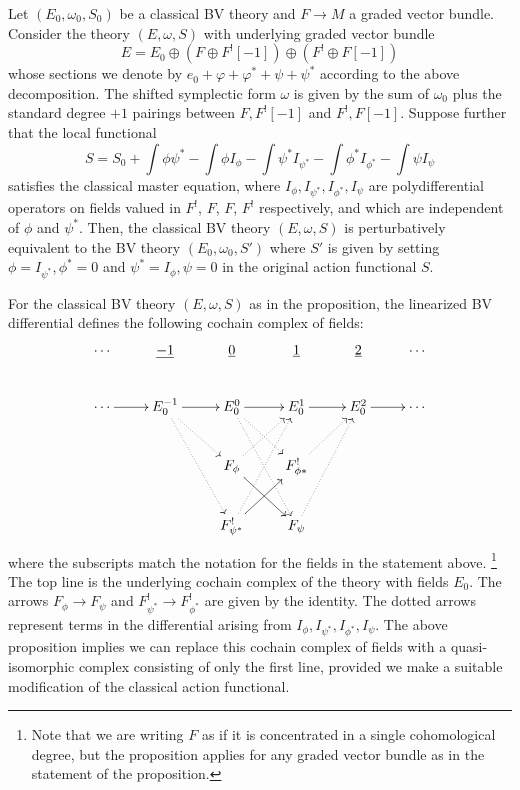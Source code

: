 \documentclass[10pt, oneside]{article}
\begin{document}
\begin{prop} 
\label{prop:BRSTdoublet}
Let $(E_0, \omega_0, S_0)$ be a classical BV theory and $F \to M$ a graded vector bundle.
Consider the theory $(E, \omega, S)$ with underlying graded vector bundle
\[
E = E_0 \oplus \left(F \oplus F^! [-1]\right) \oplus \left(F^! \oplus F[-1] \right)
\]
whose sections we denote by $e_0 + \varphi + \varphi^* + \psi + \psi^*$ according to the above decomposition. 
The shifted symplectic form $\omega$ is given by the sum of $\omega_0$ plus the standard degree $+1$ pairings between $F, F^! [-1]$ and $F^!, F[-1]$. 
Suppose further that the local functional
\[
S = S_0 + \int \phi \psi^* - \int \phi I_\phi - \int \psi^* I_{\psi^*} - \int \phi^* I_{\phi^*} - \int \psi I_{\psi}
\]
satisfies the classical master equation, where $I_{\phi}, I_{\psi^*}, I_{\phi^*}, I_{\psi}$ are polydifferential operators on fields valued in $F^!$, $F$, $F$, $F^!$ respectively, and which are independent of $\phi$ and $\psi^*$.
Then, the classical BV theory $(E, \omega, S)$ is perturbatively equivalent to the BV theory $(E_0, \omega_0, S')$ where $S'$ is given by setting $\phi = I_{\psi^*}, \phi^* = 0$ and $\psi^* = I_{\phi}, \psi = 0$ in the original action functional $S$. 
\end{prop}

\begin{remark}
For the classical BV theory $(E, \omega, S)$ as in the proposition, the linearized BV differential defines the following cochain complex of fields:
\[\xymatrix{
\cdots & \ul{-1} & \ul{0} & \ul{1} & \ul{2} & \cdots \\
\cdots \ar[r] & E_0^{-1}\ar[r] \ar@{.>}[dr] \ar@{.>}[ddr] &E_0^0 \ar@{.>}[ddr] \ar@{.>}[dr]  \ar[r]  &E_0^1 \ar[r] &E_0^2 \ar[r] &\cdots \\
&&F_\phi \ar^{~}[dr]  \ar@{.>}[ur] &F^!_{\phi*}  \ar@{.>}[ur] && \\
&&F^!_{\psi^*} \ar^{~}[ur]  \ar@{.>}[uur]  &F_\psi  \ar@{.>}[uur] && \\
}\]
where the subscripts match the notation for the fields in the statement above. \footnote{Note that we are writing $F$ as if it is concentrated in a single cohomological degree, but the proposition applies for any graded vector bundle as in the statement of the proposition.}
The top line is the underlying cochain complex of the theory with fields $E_0$. 
The arrows $F_\phi \to F_\psi$ and $F^!_{\psi^*} \to F^!_{\phi^*}$ are given by the identity.
The dotted arrows represent terms in the differential arising from $I_\phi, I_{\psi^*}, I_{\phi^*}, I_{\psi}$. 
The above proposition implies we can replace this cochain complex of fields with a quasi-isomorphic complex consisting of only the first line, provided we make a suitable modification of the classical action functional. 
\end{remark}
\end{document}

